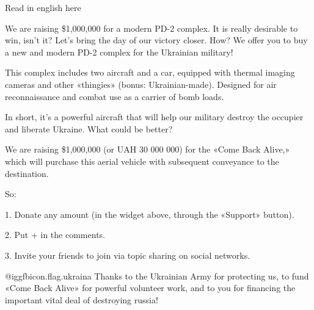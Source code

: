  
 
 
 
 

Read in english here

We are raising \$1,000,000 for a modern PD-2 complex. It is really desirable to
win, isn't it? Let's bring the day of our victory closer. How? We offer you to
buy a new and modern PD-2 complex for the Ukrainian military!

This complex includes two aircraft and a car, equipped with thermal imaging
cameras and other «thingies» (bonus: Ukrainian-made). Designed for air
reconnaissance and combat use as a carrier of bomb loads.

In short, it's a powerful aircraft that will help our military destroy the
occupier and liberate Ukraine. What could be better?

We are raising \$1,000,000 (or UAH 30 000 000) for the «Come Back Alive,» which
will purchase this aerial vehicle with subsequent conveyance to the
destination.

So:

1. Donate any amount (in the widget above, through the «Support» button).

2. Put + in the comments.

3. Invite your friends to join via topic sharing on social networks.

@igg{fbicon.flag.ukraina} Thanks to the Ukrainian Army for protecting us, to
fund «Come Back Alive» for powerful volunteer work, and to you for financing
the important vital deal of destroying russia!
